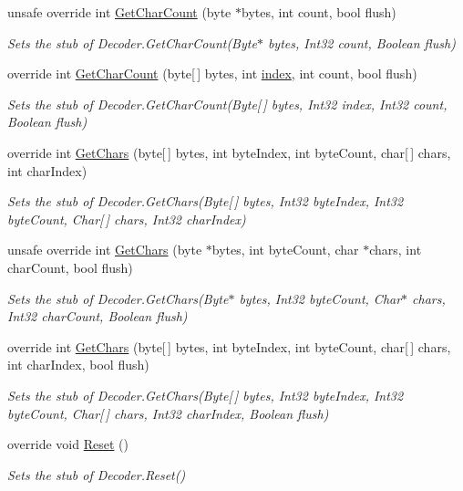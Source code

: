 \begin{DoxyCompactItemize}
unsafe override int \hyperlink{class_system_1_1_text_1_1_fakes_1_1_stub_decoder_aec739d0dd10c754172aecc2c82ad1552}{Get\-Char\-Count} (byte $\ast$bytes, int count, bool flush)
\begin{DoxyCompactList}\small\item\em Sets the stub of Decoder.\-Get\-Char\-Count(\-Byte$\ast$ bytes, Int32 count, Boolean flush)\end{DoxyCompactList}\item 
override int \hyperlink{class_system_1_1_text_1_1_fakes_1_1_stub_decoder_a295e181b512d3a8198863d1181753acf}{Get\-Char\-Count} (byte\mbox{[}$\,$\mbox{]} bytes, int \hyperlink{jquery-1_810_82-vsdoc_8js_a75bb12d1f23302a9eea93a6d89d0193e}{index}, int count, bool flush)
\begin{DoxyCompactList}\small\item\em Sets the stub of Decoder.\-Get\-Char\-Count(\-Byte\mbox{[}$\,$\mbox{]} bytes, Int32 index, Int32 count, Boolean flush)\end{DoxyCompactList}\item 
override int \hyperlink{class_system_1_1_text_1_1_fakes_1_1_stub_decoder_af91d003a4cf9d8fc08594e07bec33e11}{Get\-Chars} (byte\mbox{[}$\,$\mbox{]} bytes, int byte\-Index, int byte\-Count, char\mbox{[}$\,$\mbox{]} chars, int char\-Index)
\begin{DoxyCompactList}\small\item\em Sets the stub of Decoder.\-Get\-Chars(\-Byte\mbox{[}$\,$\mbox{]} bytes, Int32 byte\-Index, Int32 byte\-Count, Char\mbox{[}$\,$\mbox{]} chars, Int32 char\-Index)\end{DoxyCompactList}\item 
unsafe override int \hyperlink{class_system_1_1_text_1_1_fakes_1_1_stub_decoder_af35cb53bb7a8bf4ea35f6d6e3ffa74f2}{Get\-Chars} (byte $\ast$bytes, int byte\-Count, char $\ast$chars, int char\-Count, bool flush)
\begin{DoxyCompactList}\small\item\em Sets the stub of Decoder.\-Get\-Chars(\-Byte$\ast$ bytes, Int32 byte\-Count, Char$\ast$ chars, Int32 char\-Count, Boolean flush)\end{DoxyCompactList}\item 
override int \hyperlink{class_system_1_1_text_1_1_fakes_1_1_stub_decoder_a58a0c42e9eda2c328b0d978ea25e4273}{Get\-Chars} (byte\mbox{[}$\,$\mbox{]} bytes, int byte\-Index, int byte\-Count, char\mbox{[}$\,$\mbox{]} chars, int char\-Index, bool flush)
\begin{DoxyCompactList}\small\item\em Sets the stub of Decoder.\-Get\-Chars(\-Byte\mbox{[}$\,$\mbox{]} bytes, Int32 byte\-Index, Int32 byte\-Count, Char\mbox{[}$\,$\mbox{]} chars, Int32 char\-Index, Boolean flush)\end{DoxyCompactList}\item 
override void \hyperlink{class_system_1_1_text_1_1_fakes_1_1_stub_decoder_a7a6257c136bfbf398683e07cd4364514}{Reset} ()
\begin{DoxyCompactList}\small\item\em Sets the stub of Decoder.\-Reset()\end{DoxyCompactList}\end{DoxyCompactItemize}
